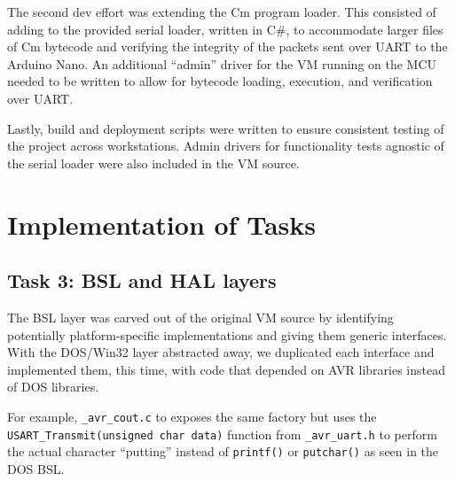 \documentclass[11pt]{article}
\begin{document}
The second dev effort was extending the Cm program loader.
This consisted of adding to the provided serial loader, written in C\#, to accommodate larger files of Cm bytecode and verifying the integrity of the packets sent over UART to the Arduino Nano.
An additional ``admin'' driver for the VM running on the MCU needed to be written to allow for bytecode loading, execution, and verification over UART.

Lastly, build and deployment scripts were written to ensure consistent testing of the project across workstations. 
Admin drivers for functionality tests agnostic of the serial loader were also included in the VM source.





\section{Implementation of Tasks}


\subsection{Task 3: BSL and HAL layers}

The BSL layer was carved out of the original VM source by identifying potentially platform-specific implementations and giving them generic interfaces. With the DOS/Win32 layer abstracted away, we duplicated each interface and implemented them, this time, with code that depended on AVR libraries instead of DOS libraries. 

For example, \lstinline[columns=fixed]{_avr_cout.c} to exposes the same factory but uses the \lstinline[columns=fixed]{USART_Transmit(unsigned char data)} function from \lstinline[columns=fixed]{_avr_uart.h} to perform the actual character ``putting'' instead of \lstinline[columns=fixed]{printf()} or \lstinline[columns=fixed]{putchar()} as seen in the DOS BSL.
\end{document}

